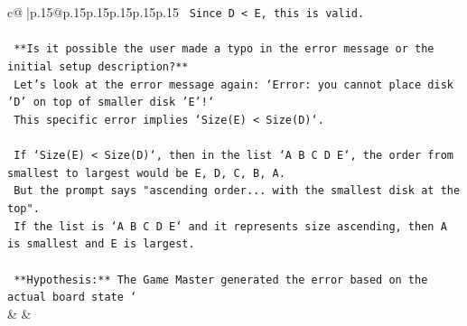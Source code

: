 \documentclass{article}
\begin{document}
{\begin{supertabular}{c@{$\;$}|p{.15\linewidth}@{}p{.15\linewidth}p{.15\linewidth}p{.15\linewidth}p{.15\linewidth}p{.15\linewidth}}
{{{\texttt{        Since D < E, this is valid.} \\
\\ 
\texttt{        **Is it possible the user made a typo in the error message or the initial setup description?**} \\
\texttt{        Let's look at the error message again: `Error: you cannot place disk 'D' on top of smaller disk 'E'!`} \\
\texttt{        This specific error implies `Size(E) < Size(D)`.} \\
\\ 
\texttt{        If `Size(E) < Size(D)`, then in the list `A B C D E`, the order from smallest to largest would be E, D, C, B, A.} \\
\texttt{        But the prompt says "ascending order... with the smallest disk at the top".} \\
\texttt{        If the list is `A B C D E` and it represents size ascending, then A is smallest and E is largest.} \\
\\ 
\texttt{        **Hypothesis:** The Game Master generated the error based on the actual board state `} \\
            }
        }
    }
    & & \\ \\


\end{supertabular}}
\end{document}

